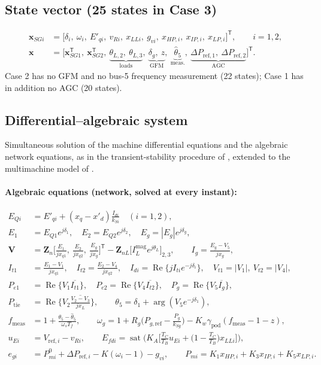 \documentclass[11pt,a4paper]{article}
\numberwithin{equation}{section}
\newcommand{\cj}[1]{\overline{#1}}
\newcommand{\re}{\operatorname{Re}}
\newcommand{\sat}{\operatorname{sat}}
\begin{document}
\subsection{State vector (25 states in Case 3)}
\begin{align}
\bm x_{SGi} &= \big[\delta_i,\ \omega_i,\ E'_{qi},\ v_{Ri},\ x_{LLi},\ g_{vi},\ x_{HP,i},\ x_{IP,i},\ x_{LP,i}\big]^{\mathsf T},\qquad i=1,2,\\
\bm x &= \big[\bm x_{SG1}^{\mathsf T},\ \bm x_{SG2}^{\mathsf T},\ \underbrace{\theta_{L,2},\ \theta_{L,3}}_{\text{loads}},\ \underbrace{\delta_g,\ z}_{\text{GFM}},\ \underbrace{\hat\theta_5}_{\text{meas.}},\ \underbrace{\Delta P_{\text{ref},1},\ \Delta P_{\text{ref},2}}_{\text{AGC}}\big]^{\mathsf T}.
\end{align}
Case 2 has no GFM and no bus-5 frequency measurement (22 states); Case 1 has in addition no AGC (20 states).

\subsection{Differential--algebraic system}
Simultaneous solution of the machine differential equations and the algebraic network equations, as in the transient-stability procedure of \cite{KothariNagrath2011}, extended to the multimachine model of \cite{SauerPai1998}.
\paragraph{Algebraic equations (network, solved at every instant):}
\begin{align}
E_{Qi} &= E'_{qi} + (x_q-x'_d)\frac{I_{di}}{k_{Si}}\quad(i=1,2),\label{eq:alg-EQ}\\
E_1 &= E_{Q1}e^{j\delta_1},\quad E_2 = E_{Q2}e^{j\delta_2},\quad E_g = |E_g|e^{j\delta_g},\\
\bm V &= \bm Z_n\Big[\tfrac{E_1}{jx_{q1}},\ \tfrac{E_2}{jx_{q2}},\ \tfrac{E_g}{jx_g}\Big]^{\mathsf T} - \bm Z_{nL}\big[I_L^{\text{mag}}e^{j\theta_{L}}\big]_{2,3},\qquad
I_g = \frac{E_g - V_5}{jx_g},\\
I_{t1} &= \tfrac{E_1-V_1}{jx_{q1}},\quad I_{t2} = \tfrac{E_2-V_4}{jx_{q2}},\quad
I_{di} = \re\{jI_{ti}e^{-j\delta_i}\},\quad V_{t1}=|V_1|,\ V_{t2}=|V_4|,\\
P_{e1} &= \re\{V_1\cj{I_{t1}}\},\quad
P_{e2} = \re\{V_4\cj{I_{t2}}\},\quad
P_g = \re\{V_5\cj{I_g}\},\\
P_{\text{tie}} &= \re\Big\{V_2\cj{\tfrac{V_2-V_3}{jx_L}}\Big\},\qquad
\theta_5 = \delta_1 + \arg(V_5e^{-j\delta_1}),\\
f_{\text{meas}} &= 1 + \frac{\theta_5-\hat\theta_5}{\omega_sT_f},\qquad
\omega_g = 1 + R_g\Big(P_{g,\text{ref}} - \tfrac{P_g}{k_{Sg}}\Big) - K_w\gamma_{\text{pod}}(f_{\text{meas}}-1-z),\\
u_{Ei} &= V_{\text{ref},i} - v_{Ri},\qquad E_{fdi} = \sat\Big(K_A\Big[\tfrac{T_C}{T_B}u_{Ei} + \big(1-\tfrac{T_C}{T_B}\big)x_{LLi}\Big]\Big),\\
e_{gi} &= P_{mi}^0 + \Delta P_{\text{ref},i} - K(\omega_i-1) - g_{vi},\qquad
P_{mi} = K_1x_{HP,i}+K_3x_{IP,i}+K_5x_{LP,i}.
\end{align}
\end{document}
